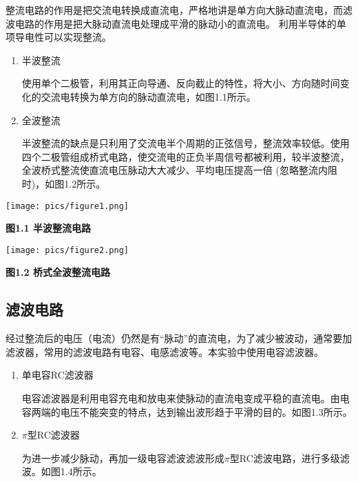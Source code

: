 \documentclass[10pt,a4paper]{article}	%
\makeatletter
\newenvironment{figurehere}
{\def\@captype{figure}}
{}
\makeatother
\begin{document}
			整流电路的作用是把交流电转换成直流电，严格地讲是单方向大脉动直流电，而滤波电路的作用是把大脉动直流电处理成平滑的脉动小的直流电。
			利用半导体的单项导电性可以实现整流。
			
			\begin{enumerate}
				\item 半波整流
				
				使用单个二极管，利用其正向导通、反向截止的特性，将大小、方向随时间变化的交流电转换为单方向的脉动直流电，如图1.1所示。
				
				
				\item 全波整流
				
				半波整流的缺点是只利用了交流电半个周期的正弦信号，整流效率较低。使用四个二极管组成桥式电路，使交流电的正负半周信号都被利用，较半波整流，全波桥式整流使直流电压脉动大大减少、平均电压提高一倍 (忽略整流内阻时)，如图1.2所示。

			\end{enumerate}

			\begin{figurehere}
				\centering
				\begin{minipage}[t]{0.48\textwidth}
				\centering
				\texttt{[image: pics/figure1.png]}
				\caption*{\bf 图1.1 半波整流电路}
				\end{minipage}
				\begin{minipage}[t]{0.48\textwidth}
				\centering
				\texttt{[image: pics/figure2.png]}
				\caption*{\bf 图1.2 桥式全波整流电路}
				\end{minipage}
			\end{figurehere}

		\subsection{滤波电路}
			
			经过整流后的电压（电流）仍然是有“脉动”的直流电，为了减少被波动，通常要加滤波器，常用的滤波电路有电容、电感滤波等。本实验中使用电容滤波器。
			
			\begin{enumerate}
				\item 单电容RC滤波器
				
				电容滤波器是利用电容充电和放电来使脉动的直流电变成平稳的直流电。由电容两端的电压不能突变的特点，达到输出波形趋于平滑的目的。如图1.3所示。
				\item $\pi$型RC滤波器
				
				为进一步减少脉动，再加一级电容滤波滤波形成$\pi$型RC滤波电路，进行多级滤波。如图1.4所示。

			\end{enumerate}
\end{document}
